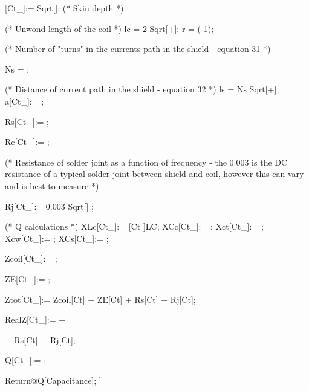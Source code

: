 \begin{mmaCell}
  \mmaLoc{\(\delta\)}[Ct_]:= Sqrt[]; (* Skin depth *)
  
  (* Unwond length of the coil *)
  lc = 2\mmaDef{\(\pi\)} Sqrt[+];
  r = (-1);
  
  (* Number of "turns" in the currents path in the shield 
  - equation 31 *)
  
  Ns = ;
  
  (* Distance of current path in the shield - equation 32 *)
  ls = Ns Sqrt[+];
  a[Ct_]:= ;
  
  Rs[Ct_]:= ;
  
  Rc[Ct_]:= ;
  
  (* Resistance of solder joint as a function of frequency - 
  the 0.003 is the DC resistance of a typical solder joint 
  between shield and coil, however this can vary 
  and is best to measure *)
  
  Rj[Ct_]:= 0.003 Sqrt[] \mmaDef{\(\Omega\)};
  
  (* Q calculations *)
  XLc[Ct_]:= [Ct ]LC;
  XCc[Ct_]:= ;
  Xct[Ct_]:= ;
  Xcw[Ct_]:= ;
  XCs[Ct_]:= ;
  
  Zcoil[Ct_]:= ;
  
  ZE[Ct_]:= ;
  
  Ztot[Ct_]:= Zcoil[Ct] + ZE[Ct] + Rs[Ct] + Rj[Ct];
  
  RealZ[Ct_]:=  +
  
  
  + Rs[Ct] + Rj[Ct];
  
  Q[Ct_]:= ;
  
  Return@Q[Capacitance];
]
\end{mmaCell}

